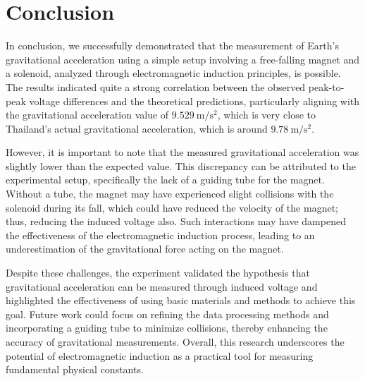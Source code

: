 \chapter{Conclusion}

In conclusion, we successfully demonstrated that the measurement of Earth's gravitational acceleration using a simple setup involving a free-falling magnet and a solenoid, analyzed through electromagnetic induction principles, is possible. The results indicated quite a strong correlation between the observed peak-to-peak voltage differences and the theoretical predictions, particularly aligning with the gravitational acceleration value of $\qty{9.529}{\meter\per\second^2}$, which is very close to Thailand's actual gravitational acceleration, which is around $\qty{9.78}{\meter\per\second^2}$.

However, it is important to note that the measured gravitational acceleration was slightly lower than the expected value. This discrepancy can be attributed to the experimental setup, specifically the lack of a guiding tube for the magnet. Without a tube, the magnet may have experienced slight collisions with the solenoid during its fall, which could have reduced the velocity of the magnet; thus, reducing the induced voltage also. Such interactions may have dampened the effectiveness of the electromagnetic induction process, leading to an underestimation of the gravitational force acting on the magnet.

Despite these challenges, the experiment validated the hypothesis that gravitational acceleration can be measured through induced voltage and highlighted the effectiveness of using basic materials and methods to achieve this goal. Future work could focus on refining the data processing methods and incorporating a guiding tube to minimize collisions, thereby enhancing the accuracy of gravitational measurements. Overall, this research underscores the potential of electromagnetic induction as a practical tool for measuring fundamental physical constants.

\newpage
